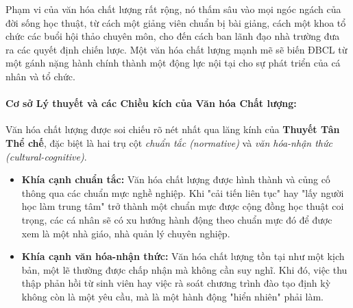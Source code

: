 \documentclass[12pt, a4paper, openany]{report}
\begin{document}
Phạm vi của văn hóa chất lượng rất rộng, nó thấm sâu vào mọi ngóc ngách của đời sống học thuật, từ cách một giảng viên chuẩn bị bài giảng, cách một khoa tổ chức các buổi hội thảo chuyên môn, cho đến cách ban lãnh đạo nhà trường đưa ra các quyết định chiến lược. Một văn hóa chất lượng mạnh mẽ sẽ biến ĐBCL từ một gánh nặng hành chính thành một động lực nội tại cho sự phát triển của cá nhân và tổ chức.

\paragraph{Cơ sở Lý thuyết và các Chiều kích của Văn hóa Chất lượng:}
Văn hóa chất lượng được soi chiếu rõ nét nhất qua lăng kính của \textbf{Thuyết Tân Thể chế}, đặc biệt là hai trụ cột \textit{chuẩn tắc (normative)} và \textit{văn hóa-nhận thức (cultural-cognitive)}.
\begin{itemize}
    \item \textbf{Khía cạnh chuẩn tắc:} Văn hóa chất lượng được hình thành và củng cố thông qua các chuẩn mực nghề nghiệp. Khi "cải tiến liên tục" hay "lấy người học làm trung tâm" trở thành một chuẩn mực được cộng đồng học thuật coi trọng, các cá nhân sẽ có xu hướng hành động theo chuẩn mực đó để được xem là một nhà giáo, nhà quản lý chuyên nghiệp.
    \item \textbf{Khía cạnh văn hóa-nhận thức:} Văn hóa chất lượng tồn tại như một kịch bản, một lẽ thường được chấp nhận mà không cần suy nghĩ. Khi đó, việc thu thập phản hồi từ sinh viên hay việc rà soát chương trình đào tạo định kỳ không còn là một yêu cầu, mà là một hành động "hiển nhiên" phải làm.
\end{itemize}
\end{document}
